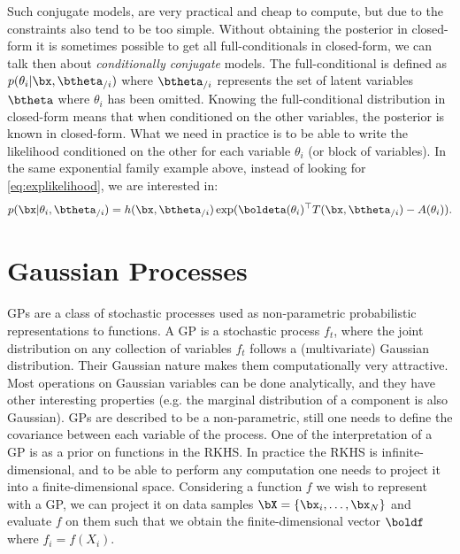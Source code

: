 Such conjugate models, are very practical and cheap to compute, but due to the constraints also tend to be too simple.
Without obtaining the posterior in closed-form it is sometimes possible to get all full-conditionals in closed-form, we can talk then about \textit{conditionally conjugate} models.
The full-conditional is defined as $p(\theta_i|\bx, \btheta_{/i})$ where $\btheta_{/i}$ represents the set of latent variables $\btheta$ where $\theta_i$ has been omitted.
Knowing the full-conditional distribution in closed-form means that when conditioned on the other variables, the posterior is known in closed-form.
What we need in practice is to be able to write the likelihood conditioned on the other  for each variable $\theta_i$ (or block of variables).
In the same exponential family example above, instead of looking for \eqref{eq:explikelihood}, we are interested in:
\begin{align*}
    p(\bx|\theta_i, \btheta_{/i}) = h(\bx, \btheta_{/i})\exp(\boldeta(\theta_i)^\top T(\bx, \btheta_{/i}) - A(\theta_i)).
\end{align*}

\section{Gaussian Processes}
\label{sec:gps}
\acf{GPs} are a class of stochastic processes used as non-parametric probabilistic representations to functions.
A \ac{GP} is a stochastic process $f_t$, where the joint distribution on any collection of variables $f_t$ follows a (multivariate) Gaussian distribution.
Their Gaussian nature makes them computationally very attractive.
Most operations on Gaussian variables can be done analytically, and they have other interesting properties (e.g. the marginal distribution of a component is also Gaussian). 
\ac{GPs} are described to be a non-parametric, still one needs to define the covariance between each variable of the process.
One of the interpretation of a \ac{GP} is as a prior on functions in the \acf{RKHS}.
In practice the \ac{RKHS} is infinite-dimensional, and to be able to perform any computation one needs to project it into a finite-dimensional space.
Considering a function $f$ we wish to represent with a \ac{GP}, we can project it on data samples $\bX = \{\bx_i, \ldots, \bx_N\}$ and evaluate $f$ on them such that we obtain the finite-dimensional vector $\boldf$ where $f_i = f(X_i)$.

